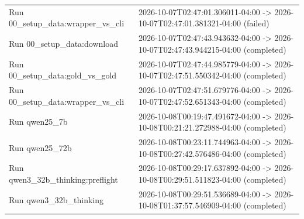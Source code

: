 \begin{table}[htbp]
\begin{tabular}{ll}
Run 00_setup_data:wrapper_vs_cli & 2026-10-07T02:47:01.306011-04:00 -> 2026-10-07T02:47:01.381321-04:00 (failed) \\
Run 00_setup_data:download & 2026-10-07T02:47:43.943632-04:00 -> 2026-10-07T02:47:43.944215-04:00 (completed) \\
Run 00_setup_data:gold_vs_gold & 2026-10-07T02:47:44.985779-04:00 -> 2026-10-07T02:47:51.550342-04:00 (completed) \\
Run 00_setup_data:wrapper_vs_cli & 2026-10-07T02:47:51.679776-04:00 -> 2026-10-07T02:47:52.651343-04:00 (completed) \\
Run qwen25_7b & 2026-10-08T00:19:47.491672-04:00 -> 2026-10-08T00:21:21.272988-04:00 (completed) \\
Run qwen25_72b & 2026-10-08T00:23:11.744963-04:00 -> 2026-10-08T00:27:42.576486-04:00 (completed) \\
Run qwen3_32b_thinking:preflight & 2026-10-08T00:29:17.637892-04:00 -> 2026-10-08T00:29:51.511823-04:00 (completed) \\
Run qwen3_32b_thinking & 2026-10-08T00:29:51.536689-04:00 -> 2026-10-08T01:37:57.546909-04:00 (completed) \\
\bottomrule
\end{tabular}
\end{table}
